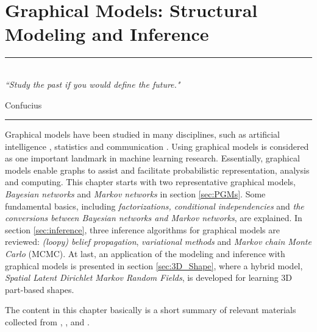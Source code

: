 
\chapter{Graphical Models: Structural Modeling and Inference} %

\label{Chapter2} %


\rule{\textwidth}{0.4pt} \\[0.5cm]
\textit{``Study the past if you would define the future."}

\begin{flushright}
Confucius
\end{flushright}
\rule{\textwidth}{0.4pt} 


Graphical models have been studied in many disciplines, such as artificial intelligence \citep{pearl_book}, statistics \citep{lauritzen_book} and communication \citep{MRF_communication}.  
Using graphical models is considered as one important landmark in machine learning research. Essentially, graphical models enable graphs to assist and facilitate probabilistic representation, 
analysis and computing. This chapter starts with two representative graphical models, \emph{Bayesian networks} and \emph{Markov networks} in section \ref{sec:PGMs}. Some fundamental basics, 
including \emph{factorizations, conditional independencies} and \emph{the conversions between Bayesian networks and Markov networks}, are explained. In section \ref{sec:inference}, three inference 
algorithms for graphical models are reviewed: \emph{(loopy) belief propagation}, \emph{variational methods} and \emph{Markov chain Monte Carlo} (MCMC). 
At last, an application of the modeling and inference with graphical models is presented in section \ref{sec:3D_Shape}, where a hybrid model,  
\emph{Spatial Latent Dirichlet Markov Random Fields}, is developed for learning 3D part-based shapes.             

The content in this chapter basically is a short summary of relevant materials collected from \cite{MLPR_book}, \cite{Barber_book}, \cite{Koller09} and \cite{Wainwright_book}.                   




